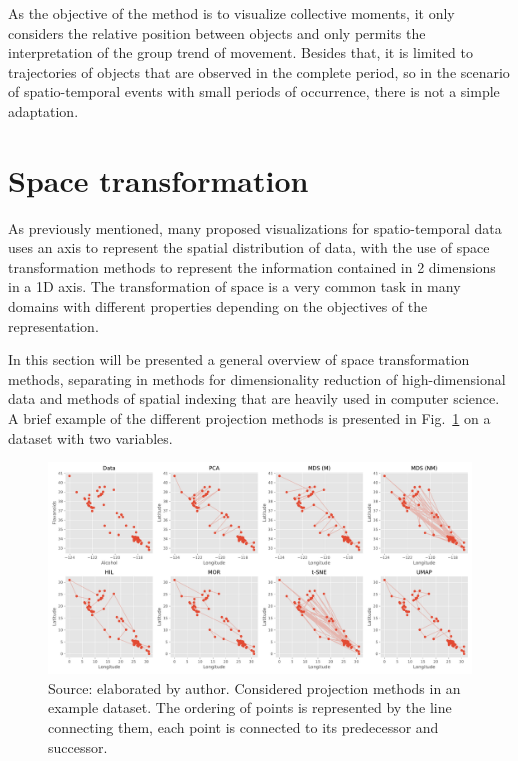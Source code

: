 %
As the objective of the method is to visualize collective moments, it only considers the relative position between objects and only permits the interpretation of the group trend of movement.
%
Besides that, it is limited to trajectories of objects that are observed in the complete period, so in the scenario of spatio-temporal events with small periods of occurrence, there is not a simple adaptation.

\section{Space transformation}
\label{seq:space-transformation}

As previously mentioned, many proposed visualizations for spatio-temporal data uses an axis to represent the spatial distribution of data,
%
with the use of space transformation methods to represent the information contained in 2 dimensions in a 1D axis.
%
The transformation of space is a very common task in many domains with different properties depending on the objectives of the representation.

%
In this section will be presented a general overview of space transformation methods, 
%
separating in methods for dimensionality reduction of high-dimensional data and methods of spatial indexing that are heavily used in computer science.
%
A brief example of the different projection methods is presented in Fig.~\ref{fig:projection-example} on a dataset with two variables.

\begin{figure}
    \centering
    \includegraphics[width = \textwidth]{src/imgs/projection-example.pdf}
    \caption{Source: elaborated by author. Considered projection methods in an example dataset. The ordering of points is represented by the line connecting them, each point is connected to its predecessor and successor.}
    \label{fig:projection-example}
\end{figure}

